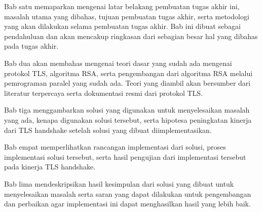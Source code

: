 Bab satu memaparkan mengenai latar belakang pembuatan tugas akhir ini, masalah utama yang dibahas, tujuan pembuatan tugas akhir, serta metodologi yang akan dilakukan selama pembuatan tugas akhir. Bab ini dibuat sebagai pendahuluan dan akan mencakup ringkasan dari sebagian besar hal yang dibahas pada tugas akhir.

Bab dua akan membahas mengenai teori dasar yang sudah ada mengenai protokol TLS, algoritma RSA, serta pengembangan dari algoritma RSA melalui pemrograman paralel yang sudah ada. Teori yang diambil akan bersumber dari literatur terpercaya serta dokumentasi resmi dari protokol TLS.

Bab tiga menggambarkan solusi yang digunakan untuk menyelesaikan masalah yang ada, kenapa digunakan solusi tersebut, serta hipotesa peningkatan kinerja dari TLS handshake setelah solusi yang dibuat diimplementasikan.

Bab empat memperlihatkan rancangan implementasi dari solusi, proses implementasi solusi tersebut, serta hasil pengujian dari implementasi tersebut pada kinerja TLS handshake.

Bab lima mendeskripsikan hasil kesimpulan dari solusi yang dibuat untuk menyelesaikan masalah serta saran yang dapat dilakukan untuk pengembangan dan perbaikan agar implementasi ini dapat menghasilkan hasil yang lebih baik.
